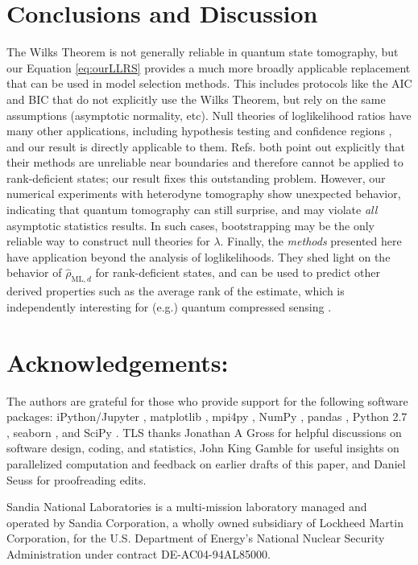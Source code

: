 \documentclass[aps,pra, twocolumn]{revtex4-1}
\newcommand{\rhohat}{\hat{\rho}}
\newcommand{\rhoML}[1]{\rhohat_{\scriptscriptstyle{\mathrm{ML},#1}}}
\begin{document}
\section{Conclusions and Discussion}
The Wilks Theorem is not generally reliable in quantum state tomography, but our Equation \eqref{eq:ourLLRS} provides a much more broadly applicable replacement that can be used in model selection methods.  This includes protocols like the AIC and BIC \cite{Akaike1974, Schwarz1978, Kass1995, Burnham2004} that do not explicitly use the Wilks Theorem, but rely on the same assumptions (asymptotic normality, etc).  Null theories of loglikelihood ratios have many other applications, including hypothesis testing \cite{Blume-Kohout2010,Moroder2013} and confidence regions \cite{Glancy2012a}, and our result is directly applicable to them.  Refs. \cite{Moroder2013,Glancy2012a} both point out explicitly that their methods are unreliable near boundaries and therefore cannot be applied to rank-deficient states; our result fixes this outstanding problem.  However, our numerical experiments with heterodyne tomography show unexpected behavior, indicating that quantum tomography can still surprise, and may violate \emph{all} asymptotic statistics results.  In such cases, bootstrapping \cite{Efron1979, Higgins2004} may be the only reliable way to construct null theories for $\lambda$.  Finally, the \emph{methods} presented here have application beyond the analysis of loglikelihoods.  They shed light on the behavior of $\rhoML{d}$ for rank-deficient states, and can be used to predict other derived properties such as the average rank of the estimate, which is independently interesting for (e.g.) quantum compressed sensing \cite{Flammia2012a, Steffens2016, Kalev2015, Kalev2015a}.

\section{Acknowledgements:} The authors are grateful for those who provide support for the following software packages: iPython/Jupyter \cite{Perez}, matplotlib
\cite{Hunter2007}, mpi4py \cite{Dalcin2011},  NumPy \cite{VanDerWalt2011}, pandas \cite{mckinney2010}, Python 2.7 
\cite{vanRossum}, seaborn \cite{Waskom2016}, and SciPy \cite{Oliphant2007a}. TLS thanks Jonathan A Gross for helpful 
discussions on software design, coding, and statistics, John King Gamble for useful insights on parallelized 
computation and feedback on earlier drafts of this paper, and Daniel Seuss for proofreading edits.

Sandia National Laboratories is a multi-mission laboratory managed and operated by Sandia Corporation, a wholly owned 
subsidiary of Lockheed Martin Corporation, for the U.S. Department of Energy's National Nuclear Security Administration 
under contract DE-AC04-94AL85000.



\end{document}
